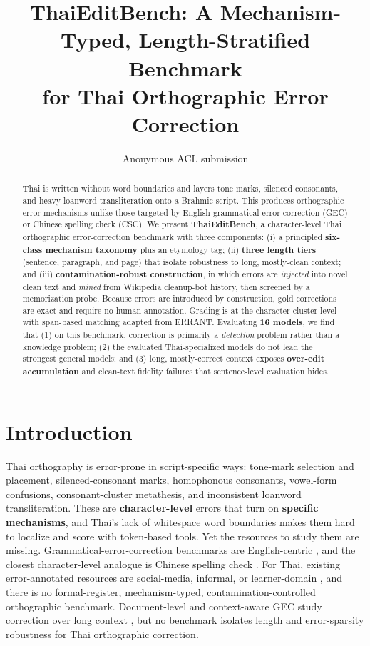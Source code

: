 \documentclass[11pt]{article}
\title{ThaiEditBench: A Mechanism-Typed, Length-Stratified Benchmark\\
       for Thai Orthographic Error Correction}
\author{Anonymous ACL submission}
\begin{document}
\maketitle

\begin{abstract}
Thai is written without word boundaries and layers tone marks, silenced consonants, and
heavy loanword transliteration onto a Brahmic script. This produces orthographic error
mechanisms unlike those targeted by English grammatical error correction (GEC) or Chinese
spelling check (CSC). We present \textbf{ThaiEditBench}, a character-level Thai orthographic
error-correction benchmark with three components: (i) a principled \textbf{six-class
mechanism taxonomy} plus an etymology tag; (ii) \textbf{three length tiers} (sentence,
paragraph, and page) that isolate robustness to long, mostly-clean context; and (iii)
\textbf{contamination-robust construction}, in which errors are \emph{injected} into novel
clean text and \emph{mined} from Wikipedia cleanup-bot history, then screened by a
memorization probe. Because errors are introduced by construction, gold corrections are exact
and require no human annotation. Grading is at the character-cluster level with span-based
matching adapted from ERRANT.
Evaluating \textbf{16 models}, we find that (1) on this benchmark, correction is primarily a
\emph{detection} problem rather than a knowledge problem; (2) the evaluated Thai-specialized
models do not lead the strongest general models; and (3) long, mostly-correct context exposes
\textbf{over-edit accumulation} and clean-text fidelity failures that sentence-level evaluation
hides.
\end{abstract}

\section{Introduction}

Thai orthography is error-prone in script-specific ways: tone-mark selection and placement,
silenced-consonant marks, homophonous consonants, vowel-form confusions, consonant-cluster
metathesis, and inconsistent loanword transliteration. These are \textbf{character-level}
errors that turn on \textbf{specific mechanisms}, and Thai's lack of whitespace word
boundaries makes them hard to localize and score with token-based tools. Yet the resources to
study them are missing. Grammatical-error-correction benchmarks are English-centric
\citep{bryant-etal-2017-automatic,bryant-etal-2019-bea,napoles-etal-2017-jfleg}, and the
closest character-level analogue is Chinese spelling check
\citep{tseng-etal-2015-introduction,liu-etal-2011-visually}. For Thai, existing
error-annotated resources are social-media, informal, or learner-domain
\citep{lertpiya-etal-2020-thai,nakwijit-purver-2022-misspelling}, and there is no
formal-register, mechanism-typed, contamination-controlled orthographic benchmark.
Document-level and context-aware GEC study correction over long context
\citep{yuan-bryant-2021-document}, but no benchmark isolates length and error-sparsity
robustness for Thai orthographic correction.
\end{document}
